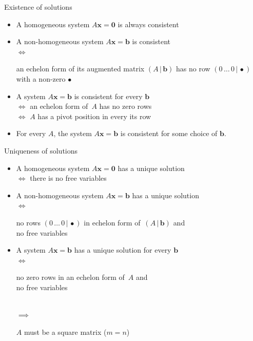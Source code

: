 \documentclass%
[handout]%
{beamer}
\newcommand\purple[1]{{\color{purple} #1}}
\newcommand{\bb}{{\mathbf b}}
\newcommand{\bx}{{\mathbf x}}
\begin{document}
\begin{frame}[label=existence]{Existence of solutions}
  \begin{itemize}
    \item A homogeneous system $A\bx = \mathbf{0}$ is \alert{always} consistent
    \item A non-homogeneous system $A\bx = \bb$ is consistent\\[5pt]
    $\iff$ \begin{minipage}{8cm}
        an echelon form of its augmented matrix $(A \,| \,\bb)$ has no row $(0\, \dots\, 0 \,| \,\bullet)$ with a non-zero $\bullet$
        \end{minipage}
    \item A system $A\bx = \bb$ is consistent for \alert{every} $\bb$ \\
    $\iff$ an echelon form of~$A$ has no zero rows\\ $\iff$ $A$ has a pivot position in every its row
    \item For every $A$, the system $A\bx = \bb$ is consistent for \alert{some} choice of $\bb$.
  \end{itemize}
\end{frame}


\begin{frame}[label=uniqueness]{Uniqueness of solutions}

  \begin{itemize}
   \item A homogeneous system $A\bx = \mathbf{0}$ has a unique solution \\
   $\iff$ there is \alert{no} free variables
      \vspace{2pt}
   \item A non-homogeneous system $A\bx = \bb$ has a unique solution\\[5pt]
   $\iff$ \begin{minipage}{9cm}
      \alert{no} rows  $(0\, \dots\, 0 \,| \,\bullet)$ in echelon form of~$(A \,|\,\bb)$ \purple{and} \\
      \alert{no} free variables
      \end{minipage}
      \vspace{2pt}
   \item A system $A\bx =\bb$ has a unique solution for \alert{every} $\bb$\\[5pt]
    $\iff$ \begin{minipage}{9cm}
      \alert{no} zero rows in an echelon form of~$A$  \purple{and} \\
      \alert{no} free variables
      \end{minipage}\\[5pt]
    $\implies$ \begin{minipage}{9cm}
      $A$ must be a \alert{square matrix} ($m=n$)
    \end{minipage}
  \end{itemize}

\end{frame}
\end{document}
